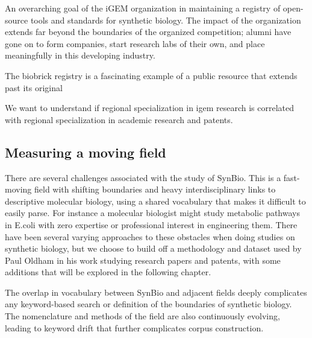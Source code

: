 \documentclass[12pt,a4paper]{article}
\begin{document}
	An overarching goal of the iGEM organization in maintaining a registry of open-source tools and standards for synthetic biology. The impact of the organization extends far beyond the boundaries of the organized competition; alumni have gone on to form companies, start research labs of their own, and place meaningfully in this developing industry.
	
	The biobrick registry is a fascinating example of a public resource that extends past its original
	
	We want to understand if regional specialization in igem research is correlated with regional specialization in academic research and patents.
	
	
	
	\subsection{Measuring a moving field}
	
	There are several challenges associated with the study of SynBio. This is a fast-moving field with shifting boundaries and heavy interdisciplinary links to descriptive molecular biology, using a shared vocabulary that makes it difficult to easily parse. For instance a molecular biologist might study metabolic pathways in E.coli with zero expertise or professional interest in engineering them. There have been several varying approaches to these obstacles when doing studies on synthetic biology, but we choose to build off a methodology and dataset used by Paul Oldham in his work studying research papers and patents, with some additions that will be explored in the following chapter.
	
	The overlap in vocabulary between SynBio and adjacent fields deeply complicates any keyword-based search or definition of the boundaries of synthetic biology. The nomenclature and methods of the field are also continuously evolving, leading to keyword drift that further complicates corpus construction. 
	
\end{document}
